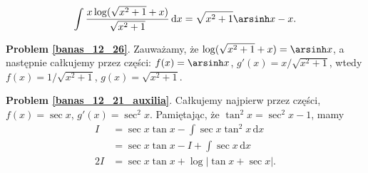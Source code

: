 \begin{problem_with_solution}
    \label{banas_12_26}%
    \begin{equation}
        \int \frac{x \log(\sqrt{x^2+1}+x)}{\sqrt{x^2+1}} \,\mathrm{d}x = \sqrt{x^2+1} \arsinh x - x.
    \end{equation}
\end{problem_with_solution}

\textbf{Problem \ref{banas_12_26}}.
Zauważamy, że $\log(\sqrt{x^2+1} + x) = \arsinh x$, a następnie całkujemy przez części: $f(x) = \arsinh x$, $g'(x) = x / \sqrt{x^2+1}$, wtedy $f(x) = 1/\sqrt{x^2+1}$, $g(x) = \sqrt{x^2+1}$.


\textbf{Problem \ref{banas_12_21_auxilia}}.
Całkujemy najpierw przez części, $f(x) = \sec x$, $g'(x) = \sec^2 x$.
Pamiętając, że $\tan^2 x = \sec^2 x - 1$, mamy
\begin{align}
    I & = \sec x \tan x - \int \sec x \tan^2 x \,\mathrm{d} x \\
        & = \sec x \tan x - I + \int \sec x \,\mathrm{d}x \\
    2I & = \sec x \tan x + \log |\tan x + \sec x|.
\end{align}

